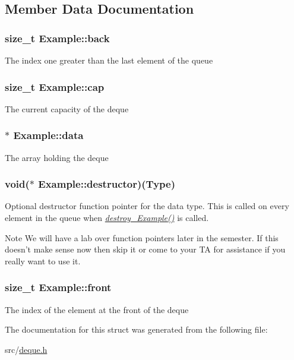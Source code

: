 \subsection{Member Data Documentation}
\hypertarget{structExample_ab52696b8c662a542dccff1fabda7de00}{
\subsubsection[{back}]{\setlength{\rightskip}{0pt plus 5cm}size\-\_\-t Example\-::back}}\label{structExample_ab52696b8c662a542dccff1fabda7de00}
The index one greater than the last element of the queue \hypertarget{structExample_a42fd483a97081133af34019cfb99c875}{
\subsubsection[{cap}]{\setlength{\rightskip}{0pt plus 5cm}size\-\_\-t Example\-::cap}}\label{structExample_a42fd483a97081133af34019cfb99c875}
The current capacity of the deque \hypertarget{structExample_aff9c97770bf4afc778ac2fc0c693d3b0}{
\subsubsection[{data}]{$\ast$ Example\-::data}}\label{structExample_aff9c97770bf4afc778ac2fc0c693d3b0}
The array holding the deque \hypertarget{structExample_ac21bed3a8515d41511b4e54b2c46b46d}{
\subsubsection[{destructor}]{\setlength{\rightskip}{0pt plus 5cm}void($\ast$ Example\-::destructor)({\bf Type})}}\label{structExample_ac21bed3a8515d41511b4e54b2c46b46d}
Optional destructor function pointer for the data type. This is called on every element in the queue when {\itshape \hyperlink{deque_8h_ad9998ed1cadaff66c209e8b666185f70}{destroy\-\_\-\-Example()}} is called.

\begin{DoxyNote}{Note}
We will have a lab over function pointers later in the semester. If this doesn't make sense now then skip it or come to your T\-A for assistance if you really want to use it. 
\end{DoxyNote}
\hypertarget{structExample_ad28f26e5c53b98255d98b65e82fae766}{
\subsubsection[{front}]{\setlength{\rightskip}{0pt plus 5cm}size\-\_\-t Example\-::front}}\label{structExample_ad28f26e5c53b98255d98b65e82fae766}
The index of the element at the front of the deque 

The documentation for this struct was generated from the following file\-:\begin{DoxyCompactItemize}
\item 
src/\hyperlink{deque_8h}{deque.\-h}\end{DoxyCompactItemize}
